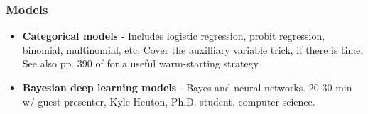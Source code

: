 \documentclass{article} %
\begin{document}
\subsubsection{Models}

\begin{itemize}
\item \textbf{Categorical models} - Includes logistic regression, probit regression,  binomial,  multinomial,  etc.  Cover the auxilliary variable trick, if there is time. See also pp.  390 of \cite{hoff2009first} for a useful warm-starting strategy.  
\item \textbf{Bayesian deep learning models} -  Bayes and neural networks.   20-30 min w/ guest presenter,  Kyle Heuton,  Ph.D.  student,  computer science.
\end{itemize}

%
%
%
\end{document}
